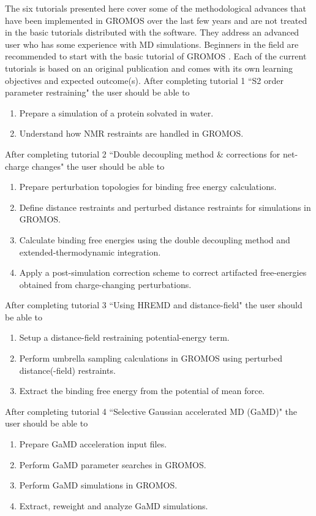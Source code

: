 The six tutorials presented here cover some of the methodological advances that have been implemented in GROMOS over the last few years and are not treated in the basic tutorials distributed with the software. 
They address an advanced user who has some experience with MD simulations. Beginners in the field are recommended to start with the basic tutorial of GROMOS \cite{volume_7}. Each of the current tutorials is based on an original publication and comes with its own learning objectives and expected outcome(s). 
After completing tutorial 1 ``S2 order parameter restraining" the user should be able to
\begin{enumerate}
\item Prepare a simulation of a protein solvated in water.
\item Understand how NMR restraints are handled in GROMOS.
\end{enumerate}
%
After completing tutorial 2 ``Double decoupling method \& corrections for net-charge changes" the user should be able to
\begin{enumerate}
\item Prepare perturbation topologies for binding free energy calculations.
\item Define distance restraints and perturbed distance restraints for simulations in GROMOS.
\item Calculate binding free energies using the double decoupling method and extended-thermodynamic integration.
\item Apply a post-simulation correction scheme to correct artifacted free-energies obtained from charge-changing perturbations.
\end{enumerate}
%
After completing tutorial 3 ``Using HREMD and distance-field" the user should be able to
\begin{enumerate}
\item Setup a distance-field restraining potential-energy term.
\item Perform umbrella sampling calculations in GROMOS using perturbed distance(-field) restraints.
\item Extract the binding free energy from the potential of mean force.
\end{enumerate}
%
After completing tutorial 4 ``Selective Gaussian accelerated MD (GaMD)" the user should be able to
\begin{enumerate}
\item Prepare GaMD acceleration input files.
\item Perform GaMD parameter searches in GROMOS.
\item Perform GaMD simulations in GROMOS.
\item Extract, reweight and analyze GaMD simulations.
\end{enumerate}
